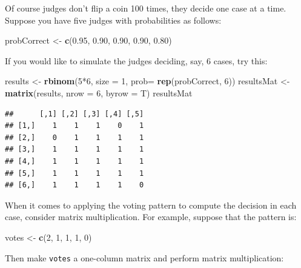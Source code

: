 \documentclass[]{book}
\makeatletter
\newenvironment{Shaded}{\begin{snugshade}}{\end{snugshade}}
\newcommand{\KeywordTok}[1]{\textcolor[rgb]{0.13,0.29,0.53}{\textbf{{#1}}}}
\newcommand{\DataTypeTok}[1]{\textcolor[rgb]{0.13,0.29,0.53}{{#1}}}
\newcommand{\DecValTok}[1]{\textcolor[rgb]{0.00,0.00,0.81}{{#1}}}
\newcommand{\FloatTok}[1]{\textcolor[rgb]{0.00,0.00,0.81}{{#1}}}
\newcommand{\StringTok}[1]{\textcolor[rgb]{0.31,0.60,0.02}{{#1}}}
\newcommand{\NormalTok}[1]{{#1}}
\newenvironment{kframe}{%
\medskip{}
\setlength{\fboxsep}{.8em}
 \def\at@end@of@kframe{}%
 \ifinner\ifhmode%
  \def\at@end@of@kframe{\end{minipage}}%
  \begin{minipage}{\columnwidth}%
 \fi\fi%
 \def\FrameCommand##1{\hskip\@totalleftmargin \hskip-\fboxsep
 \colorbox{shadecolor}{##1}\hskip-\fboxsep
     \hskip-\linewidth \hskip-\@totalleftmargin \hskip\columnwidth}%
 \MakeFramed {\advance\hsize-\width
   \@totalleftmargin\z@ \linewidth\hsize
   \@setminipage}}%
 {\par\unskip\endMakeFramed%
 \at@end@of@kframe}
\renewenvironment{Shaded}{\begin{kframe}}{\end{kframe}}
\theoremstyle{definition}
\theoremstyle{definition}
\theoremstyle{remark}
\makeatother
\begin{document}
{\begin{enumerate}
  Of course judges don't flip a coin 100 times, they decide one case at
  a time. Suppose you have five judges with probabilities as follows:

\begin{Shaded}
\begin{Highlighting}[]
\NormalTok{probCorrect <-}\StringTok{ }\KeywordTok{c}\NormalTok{(}\FloatTok{0.95}\NormalTok{, }\FloatTok{0.90}\NormalTok{, }\FloatTok{0.90}\NormalTok{, }\FloatTok{0.90}\NormalTok{, }\FloatTok{0.80}\NormalTok{)}
\end{Highlighting}
\end{Shaded}

  If you would like to simulate the judges deciding, say, 6 cases, try
  this:

\begin{Shaded}
\begin{Highlighting}[]
\NormalTok{results <-}\StringTok{ }\KeywordTok{rbinom}\NormalTok{(}\DecValTok{5}\NormalTok{*}\DecValTok{6}\NormalTok{, }\DataTypeTok{size =} \DecValTok{1}\NormalTok{, }\DataTypeTok{prob=} \KeywordTok{rep}\NormalTok{(probCorrect, }\DecValTok{6}\NormalTok{))}
\NormalTok{resultsMat <-}\StringTok{ }\KeywordTok{matrix}\NormalTok{(results, }\DataTypeTok{nrow =} \DecValTok{6}\NormalTok{, }\DataTypeTok{byrow =} \NormalTok{T)}
\NormalTok{resultsMat}
\end{Highlighting}
\end{Shaded}

\begin{verbatim}
##      [,1] [,2] [,3] [,4] [,5]
## [1,]    1    1    1    0    1
## [2,]    0    1    1    1    1
## [3,]    1    1    1    1    1
## [4,]    1    1    1    1    1
## [5,]    1    1    1    1    1
## [6,]    1    1    1    1    0
\end{verbatim}

  When it comes to applying the voting pattern to compute the decision
  in each case, consider matrix multiplication. For example, suppose
  that the pattern is:

\begin{Shaded}
\begin{Highlighting}[]
\NormalTok{votes <-}\StringTok{ }\KeywordTok{c}\NormalTok{(}\DecValTok{2}\NormalTok{, }\DecValTok{1}\NormalTok{, }\DecValTok{1}\NormalTok{, }\DecValTok{1}\NormalTok{, }\DecValTok{0}\NormalTok{)}
\end{Highlighting}
\end{Shaded}

  Then make \texttt{votes} a one-column matrix and perform matrix
  multiplication:


\end{enumerate}}
\end{document}
